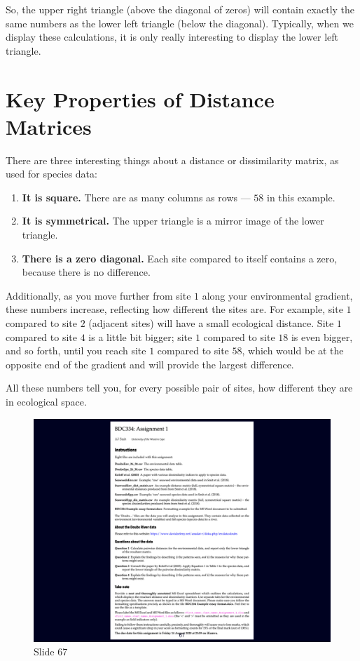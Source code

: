 \documentclass[
  10pt,
]{book}
\providecommand{\tightlist}{%
  \setlength{\itemsep}{0pt}\setlength{\parskip}{0pt}}
\begin{document}
So, the upper right triangle (above the diagonal of zeros) will contain
exactly the same numbers as the lower left triangle (below the
diagonal). Typically, when we display these calculations, it is only
really interesting to display the lower left triangle.

\section{Key Properties of Distance
Matrices}\label{key-properties-of-distance-matrices}

There are three interesting things about a distance or dissimilarity
matrix, as used for species data:

\begin{enumerate}
\def\labelenumi{\arabic{enumi}.}
\tightlist
\item
  \textbf{It is square.} There are as many columns as rows --- \(58\) in
  this example.
\item
  \textbf{It is symmetrical.} The upper triangle is a mirror image of
  the lower triangle.
\item
  \textbf{There is a zero diagonal.} Each site compared to itself
  contains a zero, because there is no difference.
\end{enumerate}

Additionally, as you move further from site \(1\) along your
environmental gradient, these numbers increase, reflecting how different
the sites are. For example, site \(1\) compared to site \(2\) (adjacent
sites) will have a small ecological distance. Site \(1\) compared to
site \(4\) is a little bit bigger; site \(1\) compared to site \(18\) is
even bigger, and so forth, until you reach site \(1\) compared to site
\(58\), which would be at the opposite end of the gradient and will
provide the largest difference.

All these numbers tell you, for every possible pair of sites, how
different they are in ecological space.

\begin{figure}[ht]
\centering
\includegraphics[width=0.8\linewidth]{../images/BDC334/BDC334-067.jpeg}
\caption*{Slide 67}
\end{figure}
\end{document}
